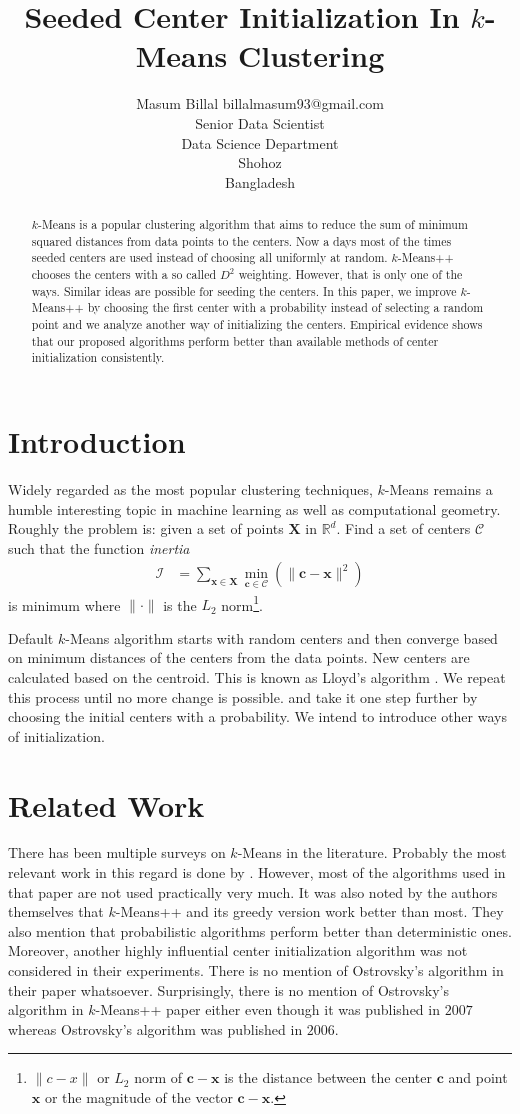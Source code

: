 \documentclass[twoside, 11pt]{article}
\title{Seeded Center Initialization In $k$-Means Clustering}
\author{\name Masum Billal \email billalmasum93@gmail.com \\
	Senior Data Scientist\\
	\addr Data Science Department\\
	Shohoz\\
	Bangladesh}
\newcommand{\x}{\mathbf{x}}
\newcommand{\X}{\mathbf{X}}
\renewcommand{\c}{\mathbf{c}}
\newcommand{\C}{\mathcal{C}}
\begin{document}
	
	\maketitle
		\begin{abstract}%
			$k$-Means is a popular clustering algorithm that aims to reduce the sum of minimum squared distances from data points to the centers. Now a days most of the times seeded centers are used instead of choosing all uniformly at random. $k$-Means++ chooses the centers with a so called $D^2$ weighting. However, that is only one of the ways. Similar ideas are possible for seeding the centers. In this paper, we improve $k$-Means++ by choosing the first center with a probability instead of selecting a random point and we analyze another way of initializing the centers. Empirical evidence shows that our proposed algorithms perform better than available methods of center initialization consistently.
		\end{abstract}
	\section{Introduction}
	Widely regarded as the most popular clustering techniques, $k$-Means remains a humble interesting topic in machine learning as well as computational geometry. Roughly the problem is: given a set of points $\X$ in $\mathbb{R}^d$. Find a set of centers $\mathcal{C}$ such that the function \textit{inertia}
		\begin{align*}
			\mathcal{I} & = \sum_{\x\in\X}\min_{\c\in\C}(\|\c-\x\|^2)
		\end{align*}
	is minimum where $\|\cdot\|$ is the $L_2$ norm\footnote{$\|c-x\|$ or $L_2$ norm of $\c-\x$ is the distance between the center $\c$ and point $\x$ or the magnitude of the vector $\c-\x$.}.
	
	Default $k$-Means algorithm starts with random centers and then converge based on minimum distances of the centers from the data points. New centers are calculated based on the centroid. This is known as Lloyd's algorithm \citep{lloyd}. We repeat this process until no more change is possible. \cite{ostrovsky} and \cite{kmeans++} take it one step further by choosing the initial centers with a probability. We intend to introduce other ways of initialization.
	\section{Related Work}
	There has been multiple surveys on $k$-Means in the literature. Probably the most relevant work in this regard is done by \cite{celebi}. However, most of the algorithms used in that paper are not used practically very much. It was also noted by the authors themselves that $k$-Means++ and its greedy version work better than most. They also mention that probabilistic algorithms perform better than deterministic ones. Moreover, another highly influential center initialization algorithm \citep{ostrovsky} was not considered in their experiments. There is no mention of Ostrovsky's algorithm in their paper whatsoever. Surprisingly, there is no mention of Ostrovsky's algorithm in $k$-Means++ paper either even though it was published in $2007$ whereas Ostrovsky's algorithm was published in $2006$.
	
\end{document}
